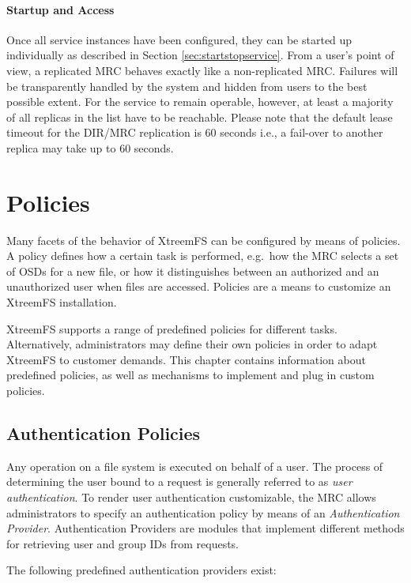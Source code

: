 \documentclass[a4paper,10pt]{book}
\begin{document}
\subsubsection{Startup and Access}
Once all service instances have been configured, they can be started up individually as described in Section \ref{sec:startstopservice}. From a user's point of view, a replicated MRC behaves exactly like a non-replicated MRC. Failures will be transparently handled by the system and hidden from users to the best possible extent. For the service to remain operable, however, at least a majority of all replicas in the list have to be reachable. Please note that the default lease timeout for the DIR/MRC replication is 60 seconds i.e., a fail-over to another replica may take up to 60 seconds.


\chapter{Policies} \label{chap:policies}
Many facets of the behavior of XtreemFS can be configured by means of policies. A policy defines how a certain task is performed, e.g.\ how the MRC selects a set of OSDs for a new file, or how it distinguishes between an authorized and an unauthorized user when files are accessed. Policies are a means to customize an XtreemFS installation.

XtreemFS supports a range of predefined policies for different tasks. Alternatively, administrators may define their own policies in order to adapt XtreemFS to customer demands. This chapter contains information about predefined policies, as well as mechanisms to implement and plug in custom policies.

\section{Authentication Policies} \label{sec:authentication_policies}
Any operation on a file system is executed on behalf of a user. The process of determining the user bound to a request is generally referred to as \emph{user authentication}. To render user authentication customizable, the MRC allows administrators to specify an authentication policy by means of an \emph{Authentication Provider}. Authentication Providers are modules that implement different methods for retrieving user and group IDs from requests.

The following predefined authentication providers exist:
\end{document}
